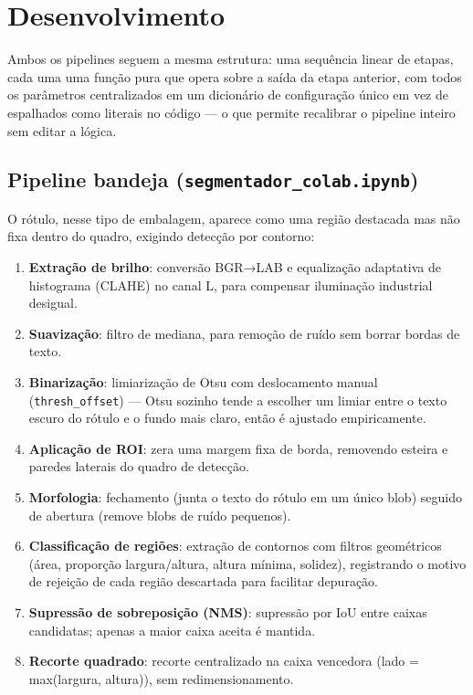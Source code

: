 \documentclass[a4paper,11pt]{article}
\begin{document}
\section{Desenvolvimento}

Ambos os pipelines seguem a mesma estrutura: uma sequência linear de etapas, cada uma uma função
pura que opera sobre a saída da etapa anterior, com todos os parâmetros centralizados em um
dicionário de configuração único em vez de espalhados como literais no código --- o que permite
recalibrar o pipeline inteiro sem editar a lógica.

\subsection{Pipeline bandeja (\texttt{segmentador\_colab.ipynb})}

O rótulo, nesse tipo de embalagem, aparece como uma região destacada mas não fixa dentro do
quadro, exigindo detecção por contorno:

\begin{enumerate}[nosep]
  \item \textbf{Extração de brilho}: conversão BGR→LAB e equalização adaptativa de histograma
        (CLAHE) no canal L, para compensar iluminação industrial desigual.
  \item \textbf{Suavização}: filtro de mediana, para remoção de ruído sem borrar bordas de texto.
  \item \textbf{Binarização}: limiarização de Otsu com deslocamento manual
        (\texttt{thresh\_offset}) --- Otsu sozinho tende a escolher um limiar entre o texto
        escuro do rótulo e o fundo mais claro, então é ajustado empiricamente.
  \item \textbf{Aplicação de ROI}: zera uma margem fixa de borda, removendo esteira e paredes
        laterais do quadro de detecção.
  \item \textbf{Morfologia}: fechamento (junta o texto do rótulo em um único blob) seguido de
        abertura (remove blobs de ruído pequenos).
  \item \textbf{Classificação de regiões}: extração de contornos com filtros geométricos (área,
        proporção largura/altura, altura mínima, solidez), registrando o motivo de rejeição de
        cada região descartada para facilitar depuração.
  \item \textbf{Supressão de sobreposição (NMS)}: supressão por IoU entre caixas candidatas;
        apenas a maior caixa aceita é mantida.
  \item \textbf{Recorte quadrado}: recorte centralizado na caixa vencedora (lado =
        max(largura, altura)), sem redimensionamento.
\end{enumerate}
\end{document}
